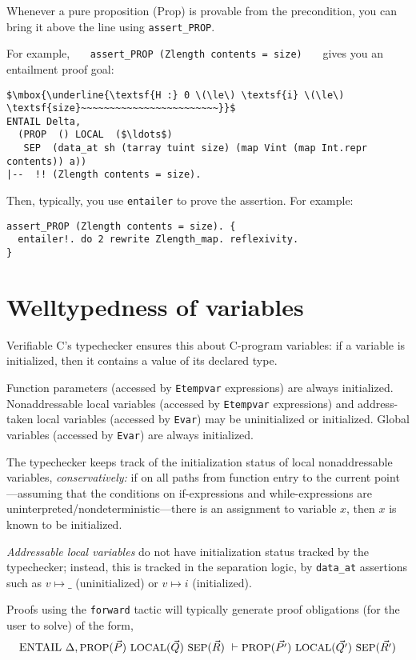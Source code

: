\documentclass[12pt,fleqn,openany,oneside,showtrims]{memoir}
\newcommand{\ychapter}[2]{\chapter[#1]{#1}}
\begin{document}
Whenever a pure proposition (\textsf{Prop}) is provable from the precondition, you can bring it above the line using \lstinline{assert_PROP}.

For example, ~~~\lstinline{assert_PROP (Zlength contents = size)}~~~
gives you an entailment proof goal:

\begin{lstlisting}
$\mbox{\underline{\textsf{H :} 0 \(\le\) \textsf{i} \(\le\) \textsf{size}~~~~~~~~~~~~~~~~~~~~~~~~}}$
ENTAIL Delta,
  (PROP  () LOCAL  ($\ldots$)
   SEP  (data_at sh (tarray tuint size) (map Vint (map Int.repr contents)) a))
|--  !! (Zlength contents = size).
\end{lstlisting}

Then, typically, you use \lstinline{entailer} to prove the assertion.
For example:

\begin{lstlisting}
assert_PROP (Zlength contents = size). {
  entailer!. do 2 rewrite Zlength_map. reflexivity.
}
\end{lstlisting}




\ychapter{Welltypedness of variables}{}
\label{refcard:tcval2}

Verifiable C's typechecker ensures this about
C-program variables: if a variable is initialized, then it contains
a value of its declared type.

Function parameters (accessed by
\lstinline{Etempvar} expressions)
are always initialized.
Nonaddressable local variables (accessed by
\lstinline{Etempvar} expressions) and address-taken local variables
(accessed by \lstinline{Evar})
may be uninitialized or initialized.
Global variables (accessed by \lstinline{Evar}) are always
initialized.

The typechecker keeps track of the
initialization status of local nonaddressable
variables, \emph{conservatively:}
if on all paths from function entry to the current
point---assuming that the conditions on if-expressions
and while-expressions are uninterpreted/nondeterministic---there
is an assignment to variable $x$, then $x$ is known to
be initialized.

\emph{Addressable local variables} do not
have initialization status tracked by the typechecker;
instead, this is tracked in the separation logic,
by \lstinline{data_at} assertions such as $v \mapsto \_$
(uninitialized)
or $v \mapsto i$ (initialized).

Proofs using the \lstinline{forward} tactic will typically
generate proof obligations (for the user to solve)
of the form,
\[
\mathrm{ENTAIL}~\Delta,
\mbox{\small PROP}(\vec{P})~
\mbox{\small LOCAL}(\vec{Q})~
\mbox{\small SEP}(\vec{R})
~\vdash
\mbox{\small PROP}(\vec{P'})~
\mbox{\small LOCAL}(\vec{Q'})~
\mbox{\small SEP}(\vec{R'})
\]
\end{document}
